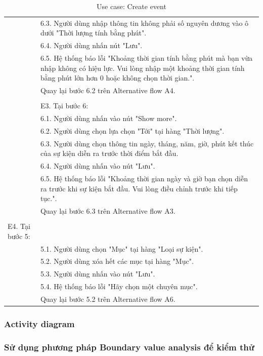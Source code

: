 \documentclass[a4paper, 12pt]{article}
\begin{document}
\begin{table}[H]
\begin{tabular}{|l|p{11cm}|}
        & 6.3. Người dùng nhập thông tin không phải số nguyên dương vào ô dưới "Thời lượng tính bằng phút". \\
        & 6.4. Người dùng nhấn nút "Lưu". \\
        & 6.5. Hệ thống báo lỗi "Khoảng thời gian tính bằng phút mà bạn vừa nhập không có hiệu lực. Vui lòng nhập một khoảng thời gian tính bằng phút lớn hơn 0 hoặc không chọn thời gian.". \\
        & Quay lại bước 6.2 trên Alternative flow A4. \\
        & \\
        & E3. Tại bước 6: \\
        & 6.1. Người dùng nhấn vào nút "Show more". \\
        & 6.2. Người dùng chọn lựa chọn "Tới" tại hàng "Thời lượng". \\
        & 6.3. Người dùng chọn thông tin ngày, tháng, năm, giờ, phút kết thúc của sự kiện diễn ra trước thời điểm bắt đầu. \\
        & 6.4. Người dùng nhấn vào nút "Lưu". \\
        & 6.5. Hệ thống báo lỗi "Khoảng thời gian ngày và giờ bạn chọn diễn ra trước khi sự kiện bắt đầu. Vui lòng điều chỉnh trước khi tiếp tục.". \\
        & Quay lại bước 6.3 trên Alternative flow A3. \\
        & \\
        E4. Tại bước 5: \\
        & 5.1. Người dùng chọn "Mục" tại hàng "Loại sự kiện". \\
        & 5.2. Người dùng xóa hết các mục tại hàng "Mục". \\
        & 5.3. Người dùng nhấn vào nút "Lưu". \\
        & 5.4. Hệ thống báo lỗi "Hãy chọn một chuyên mục". \\
        & Quay lại bước 5.2 trên Alternative flow A6. \\
        \hline
    \end{tabular}
    \caption{Use case: Create event}
    \label{Use case: Create event}
\end{table}
\subsubsection{Activity diagram}
\subsubsection{Sử dụng phương pháp Boundary value analysis để kiểm thử}
\end{document}
